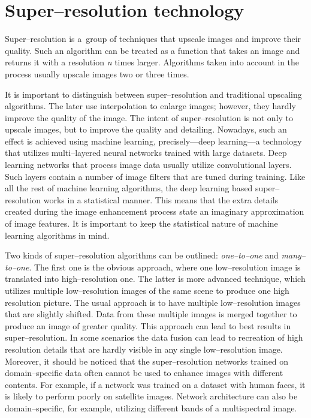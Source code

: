 \section{Super--resolution technology}
Super--resolution is a~group of techniques that upscale images and improve
their quality.
Such an algorithm can be treated as a function that takes an image and returns
it with a resolution \textit{n} times larger.
Algorithms taken into account in the process usually upscale images two or
three times.

It is important to distinguish between super--resolution and traditional
upscaling algorithms.
The later use interpolation to enlarge images; however, they hardly improve the
quality of the image.
The intent of super--resolution is not only to upscale images, but to improve
the quality and detailing.
Nowadays, such an effect is achieved using machine learning, precisely---deep
learning---a technology that utilizes multi--layered neural networks trained
with large datasets.
Deep learning networks that process image data usually utilize convolutional
layers.
Such layers contain a number of image filters that are tuned during training.
Like all the rest of machine learning algorithms, the deep learning based
super--resolution works in a statistical manner.
This means that the extra details created during the image enhancement process
state an imaginary approximation of image features.
It is important to keep the statistical nature of machine learning algorithms
in mind.

Two kinds of super--resolution algorithms can be outlined:
\textit{one--to--one} and \textit{many--to--one}.
The first one is the obvious approach, where one low--resolution image is
translated into high--resolution one.
The latter is more advanced technique, which utilizes multiple low--resolution
images of the same scene to produce one high resolution picture.
The usual approach is to have multiple low--resolution images that are slightly shifted.
Data from these multiple images is merged together to produce an image of greater quality.
This approach can lead to best results in super--resolution.
In some scenarios the data fusion can lead to recreation of high resolution details that are hardly visible in any single low--resolution image.
Moreover, it should be noticed that the super--resolution networks trained on
domain--specific data often cannot be used to enhance images with different
contents.
For example, if a network was trained on a dataset with human faces, it is
likely to perform poorly on satellite images.
Network architecture can also be domain--specific, for example, utilizing
different bands of a multispectral image.

